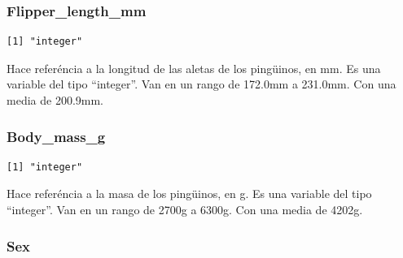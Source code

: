 \documentclass[
  letterpaper,
  DIV=11,
  numbers=noendperiod]{scrartcl}
\newenvironment{Shaded}{\begin{snugshade}}{\end{snugshade}}
\newcommand{\FunctionTok}[1]{\textcolor[rgb]{0.28,0.35,0.67}{#1}}
\newcommand{\NormalTok}[1]{\textcolor[rgb]{0.00,0.23,0.31}{#1}}
\newcommand{\SpecialCharTok}[1]{\textcolor[rgb]{0.37,0.37,0.37}{#1}}
\begin{document}
\hypertarget{flipper_length_mm}{%
\subsubsection{Flipper\_length\_mm}\label{flipper_length_mm}}

\begin{Shaded}
\end{Shaded}

\begin{verbatim}
[1] "integer"
\end{verbatim}

Hace referéncia a la longitud de las aletas de los pingüinos, en mm. Es
una variable del tipo ``integer''. Van en un rango de 172.0mm a 231.0mm.
Con una media de 200.9mm.

\hypertarget{body_mass_g}{%
\subsubsection{Body\_mass\_g}\label{body_mass_g}}

\begin{Shaded}
\end{Shaded}

\begin{verbatim}
[1] "integer"
\end{verbatim}

Hace referéncia a la masa de los pingüinos, en g. Es una variable del
tipo ``integer''. Van en un rango de 2700g a 6300g. Con una media de
4202g.

\hypertarget{sex}{%
\subsubsection{Sex}\label{sex}}

\begin{Shaded}
\end{Shaded}
\end{document}
